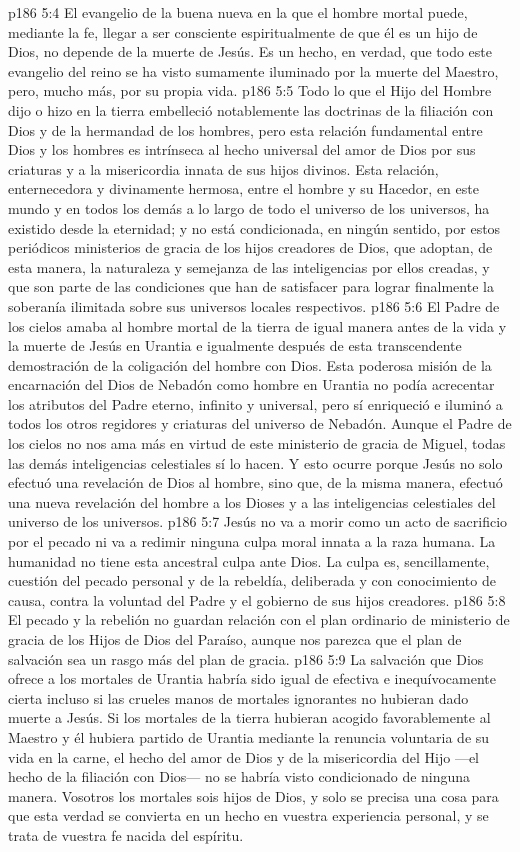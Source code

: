 \vs p186 5:4 El evangelio de la buena nueva en la que el hombre mortal puede, mediante la fe, llegar a ser consciente espiritualmente de que él es un hijo de Dios, no depende de la muerte de Jesús. Es un hecho, en verdad, que todo este evangelio del reino se ha visto sumamente iluminado por la muerte del Maestro, pero, mucho más, por su propia vida.
\vs p186 5:5 Todo lo que el Hijo del Hombre dijo o hizo en la tierra embelleció notablemente las doctrinas de la filiación con Dios y de la hermandad de los hombres, pero esta relación fundamental entre Dios y los hombres es intrínseca al hecho universal del amor de Dios por sus criaturas y a la misericordia innata de sus hijos divinos. Esta relación, enternecedora y divinamente hermosa, entre el hombre y su Hacedor, en este mundo y en todos los demás a lo largo de todo el universo de los universos, ha existido desde la eternidad; y no está condicionada, en ningún sentido, por estos periódicos ministerios de gracia de los hijos creadores de Dios, que adoptan, de esta manera, la naturaleza y semejanza de las inteligencias por ellos creadas, y que son parte de las condiciones que han de satisfacer para lograr finalmente la soberanía ilimitada sobre sus universos locales respectivos.
\vs p186 5:6 El Padre de los cielos amaba al hombre mortal de la tierra de igual manera antes de la vida y la muerte de Jesús en Urantia e igualmente después de esta transcendente demostración de la coligación del hombre con Dios. Esta poderosa misión de la encarnación del Dios de Nebadón como hombre en Urantia no podía acrecentar los atributos del Padre eterno, infinito y universal, pero sí enriqueció e iluminó a todos los otros regidores y criaturas del universo de Nebadón. Aunque el Padre de los cielos no nos ama más en virtud de este ministerio de gracia de Miguel, todas las demás inteligencias celestiales sí lo hacen. Y esto ocurre porque Jesús no solo efectuó una revelación de Dios al hombre, sino que, de la misma manera, efectuó una nueva revelación del hombre a los Dioses y a las inteligencias celestiales del universo de los universos.
\vs p186 5:7 Jesús no va a morir como un acto de sacrificio por el pecado ni va a redimir ninguna culpa moral innata a la raza humana. La humanidad no tiene esta ancestral culpa ante Dios. La culpa es, sencillamente, cuestión del pecado personal y de la rebeldía, deliberada y con conocimiento de causa, contra la voluntad del Padre y el gobierno de sus hijos creadores.
\vs p186 5:8 El pecado y la rebelión no guardan relación con el plan ordinario de ministerio de gracia de los Hijos de Dios del Paraíso, aunque nos parezca que el plan de salvación sea un rasgo más del plan de gracia.
\vs p186 5:9 La salvación que Dios ofrece a los mortales de Urantia habría sido igual de efectiva e inequívocamente cierta incluso si las crueles manos de mortales ignorantes no hubieran dado muerte a Jesús. Si los mortales de la tierra hubieran acogido favorablemente al Maestro y él hubiera partido de Urantia mediante la renuncia voluntaria de su vida en la carne, el hecho del amor de Dios y de la misericordia del Hijo ---el hecho de la filiación con Dios--- no se habría visto condicionado de ninguna manera. Vosotros los mortales sois hijos de Dios, y solo se precisa una cosa para que esta verdad se convierta en un hecho en vuestra experiencia personal, y se trata de vuestra fe nacida del espíritu.
